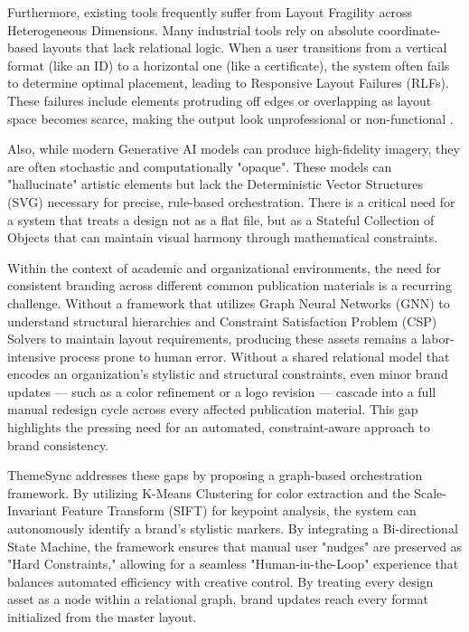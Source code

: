 \begin{refsection}
Furthermore, existing tools frequently suffer from Layout Fragility across Heterogeneous Dimensions. Many industrial tools rely on absolute coordinate-based layouts that lack relational logic. When a user transitions from a vertical format (like an ID) to a horizontal one (like a certificate), the system often fails to determine optimal placement, leading to Responsive Layout Failures (RLFs). These failures include elements protruding off edges or overlapping as layout space becomes scarce, making the output look unprofessional or non-functional \cite{Althomalietal2022,Zerinetal2025}.

Also, while modern Generative AI models can produce high-fidelity imagery, they are often stochastic and computationally "opaque". These models can "hallucinate" artistic elements but lack the Deterministic Vector Structures (SVG) necessary for precise, rule-based orchestration. There is a critical need for a system that treats a design not as a flat file, but as a Stateful Collection of Objects that can maintain visual harmony through mathematical constraints.

Within the context of academic and organizational environments, the need for consistent branding across different common publication materials is a recurring challenge. Without a framework that utilizes Graph Neural Networks (GNN) to understand structural hierarchies and Constraint Satisfaction Problem (CSP) Solvers to maintain layout requirements, producing these assets remains a labor-intensive process prone to human error. Without a shared relational model that encodes an organization's stylistic and structural constraints, even minor brand updates — such as a color refinement or a logo revision — cascade into a full manual redesign cycle across every affected publication material. This gap highlights the pressing need for an automated, constraint-aware approach to brand consistency.

ThemeSync addresses these gaps by proposing a graph-based orchestration framework. By utilizing K-Means Clustering for color extraction and the Scale-Invariant Feature Transform (SIFT) for keypoint analysis, the system can autonomously identify a brand's stylistic markers. By integrating a Bi-directional State Machine, the framework ensures that manual user "nudges" are preserved as "Hard Constraints," allowing for a seamless "Human-in-the-Loop" experience that balances automated efficiency with creative control. By treating every design asset as a node within a relational graph, brand updates reach every format initialized from the master layout.


\end{refsection}
